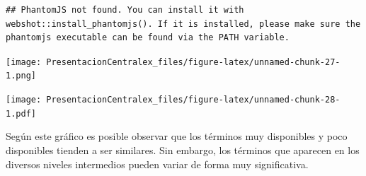 \documentclass[
]{article}
\newenvironment{Shaded}{\begin{snugshade}}{\end{snugshade}}
\newcommand{\DataTypeTok}[1]{\textcolor[rgb]{0.13,0.29,0.53}{#1}}
\newcommand{\KeywordTok}[1]{\textcolor[rgb]{0.13,0.29,0.53}{\textbf{#1}}}
\newcommand{\NormalTok}[1]{#1}
\newcommand{\OperatorTok}[1]{\textcolor[rgb]{0.81,0.36,0.00}{\textbf{#1}}}
\newcommand{\StringTok}[1]{\textcolor[rgb]{0.31,0.60,0.02}{#1}}
\begin{document}
\begin{Shaded}
\end{Shaded}

\begin{verbatim}
## PhantomJS not found. You can install it with webshot::install_phantomjs(). If it is installed, please make sure the phantomjs executable can be found via the PATH variable.
\end{verbatim}

\texttt{[image: PresentacionCentralex\_files/figure-latex/unnamed-chunk-27-1.png]}

\begin{Shaded}
\end{Shaded}

\texttt{[image: PresentacionCentralex\_files/figure-latex/unnamed-chunk-28-1.pdf]}

Según este gráfico es posible observar que los términos muy disponibles
y poco disponibles tienden a ser similares. Sin embargo, los términos
que aparecen en los diversos niveles intermedios pueden variar de forma
muy significativa.
\end{document}
